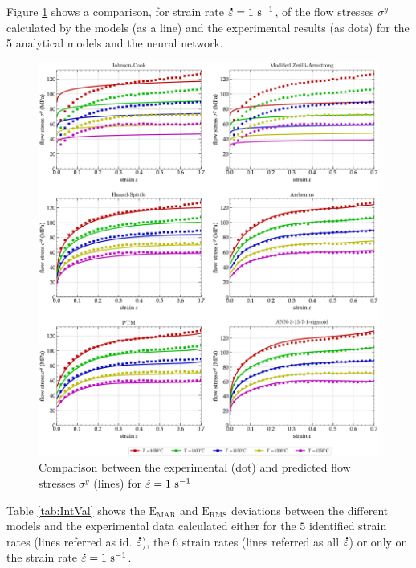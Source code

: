 \documentclass[twoside,english,1p,final,sort&compress]{elsarticle}
\theoremstyle{plain}
\DeclareRobustCommand{\mdot}[1]{\accentset{\mbox{\bfseries .}}{#1}}
\DeclareRobustCommand{\RMSE}{\text{E}_\text{RMS}}
\DeclareRobustCommand{\MARE}{\text{E}_\text{MAR}}
\DeclareRobustCommand{\ps}{\text{s}^{-1}}
\begin{document}
Figure \ref{fig:CompInt} shows a comparison, for strain rate $\mdot\varepsilon=1~\ps$, of the flow stresses $\sigma^y$ calculated by the models (as a line) and the experimental results (as dots) for the 5 analytical models and the neural network.
\begin{figure}[!ht]
\centering
\includegraphics[width=\columnwidth]
{Figures/CompInt}
\caption{Comparison between the experimental (dot) and predicted flow stresses $\sigma^y$ (lines) for $\mdot\varepsilon=1~\ps$}
\label{fig:CompInt}
\end{figure}
Table \ref{tab:IntVal} shows the $\MARE$ and $\RMSE$ deviations between the different models and the experimental data calculated either for the $5$ identified strain rates (lines referred as id. $\mdot\varepsilon$), the $6$ strain rates (lines referred as all $\mdot\varepsilon$) or only on the strain rate $\mdot\varepsilon=1~\ps$.
\end{document}
